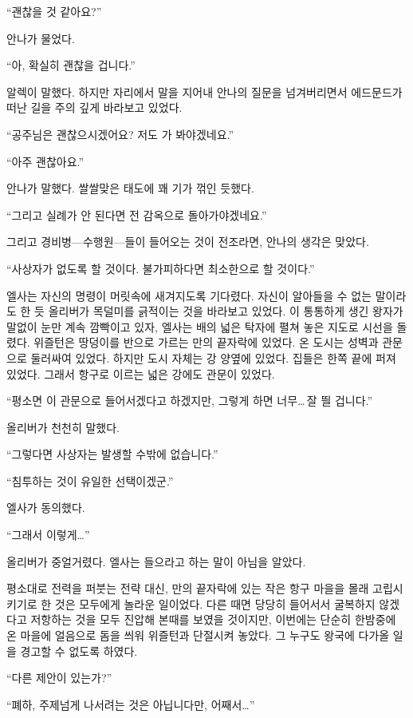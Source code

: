``괜찮을 것 같아요?''

안나가 물었다.

``아, 확실히 괜찮을 겁니다.''

알렉이 말했다. 하지만 자리에서 말을 지어내 안나의 질문을 넘겨버리면서 에드문드가 떠난 길을 주의 깊게 바라보고 있었다.

``공주님은 괜찮으시겠어요? 저도 가 봐야겠네요.''

``아주 괜찮아요.''

안나가 말했다. 쌀쌀맞은 태도에 꽤 기가 꺾인 듯했다.

``그리고 실례가 안 된다면 전 감옥으로 돌아가야겠네요.''

그리고 경비병—수행원—들이 들어오는 것이 전조라면, 안나의 생각은 맞았다.

\textbreak

\forceindent``사상자가 없도록 할 것이다. 불가피하다면 최소한으로 할 것이다.''

엘사는 자신의 명령이 머릿속에 새겨지도록 기다렸다. 자신이 알아들을 수 없는 말이라도 한 듯 올리버가 목덜미를 긁적이는 것을 바라보고 있었다. 이 통통하게 생긴 왕자가 말없이 눈만 계속 깜빡이고 있자, 엘사는 배의 넓은 탁자에 펼쳐 놓은 지도로 시선을 돌렸다. 위즐턴은 땅덩이를 반으로 가르는 만의 끝자락에 있었다. 온 도시는 성벽과 관문으로 둘러싸여 있었다. 하지만 도시 자체는 강 양옆에 있었다. 집들은 한쪽 끝에 퍼져 있었다. 그래서 항구로 이르는 넓은 강에도 관문이 있었다.

``평소면 이 관문으로 들어서겠다고 하겠지만, 그렇게 하면 너무\ldots\,잘 띌 겁니다.''

올리버가 천천히 말했다.

``그렇다면 사상자는 발생할 수밖에 없습니다.''

``침투하는 것이 유일한 선택이겠군.''

엘사가 동의했다.

``그래서 이렇게\ldots''

올리버가 중얼거렸다. 엘사는 들으라고 하는 말이 아님을 알았다.

평소대로 전력을 퍼붓는 전략 대신, 만의 끝자락에 있는 작은 항구 마을을 몰래 고립시키기로 한 것은 모두에게 놀라운 일이었다. 다른 때면 당당히 들어서서 굴복하지 않겠다고 저항하는 것을 모두 진압해 본때를 보였을 것이지만, 이번에는 단순히 한밤중에 온 마을에 얼음으로 돔을 씌워 위즐턴과 단절시켜 놓았다. 그 누구도 왕국에 다가올 일을 경고할 수 없도록 하였다.

``다른 제안이 있는가?''

``폐하, 주제넘게 나서려는 것은 아닙니다만, 어째서\ldots''

